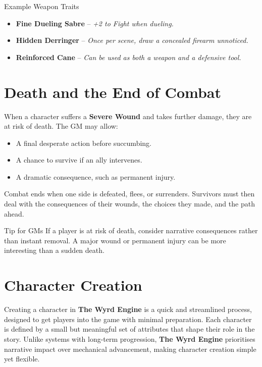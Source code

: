 \begin{DndReadAloud}{Example Weapon Traits}
\begin{itemize}
    \item \textbf{Fine Dueling Sabre} – \textit{+2 to Fight when dueling.}
    \item \textbf{Hidden Derringer} – \textit{Once per scene, draw a concealed firearm unnoticed.}
    \item \textbf{Reinforced Cane} – \textit{Can be used as both a weapon and a defensive tool.}
\end{itemize}
\end{DndReadAloud}

\section{Death and the End of Combat}
When a character suffers a \textbf{Severe Wound} and takes further damage, they are at risk of death. The GM may allow:
\begin{itemize}
    \item A final desperate action before succumbing.
    \item A chance to survive if an ally intervenes.
    \item A dramatic consequence, such as permanent injury.
\end{itemize}

Combat ends when one side is defeated, flees, or surrenders. Survivors must then deal with the consequences of their wounds, the choices they made, and the path ahead.

\begin{DndComment}{Tip for GMs}
If a player is at risk of death, consider narrative consequences rather than instant removal. A major wound or permanent injury can be more interesting than a sudden death.
\end{DndComment}


\section{Character Creation}

Creating a character in \textbf{The Wyrd Engine} is a quick and streamlined process, designed to get players into the game with minimal preparation. Each character is defined by a small but meaningful set of attributes that shape their role in the story. Unlike systems with long-term progression, \textbf{The Wyrd Engine} prioritises narrative impact over mechanical advancement, making character creation simple yet flexible.

